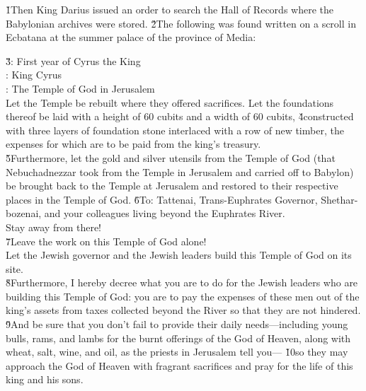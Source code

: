 \v{1}Then King Darius issued an order to search the Hall of Records where the Babylonian archives were stored. \v{2}The following was found written on a scroll in Ecbatana at the summer palace of the province of Media:

\begin{poetry}
\poeml \v{3}: First year of Cyrus the King \\
\poeml {}: King Cyrus \\
\poeml {}: The Temple of God in Jerusalem \\
\poeml Let the Temple be rebuilt where they offered sacrifices. Let the foundations thereof be laid with a height of 60 cubits and a width of 60 cubits, \v{4}constructed with three layers of foundation stone interlaced with a row of new timber, the expenses for which are to be paid from the king's treasury. \\
\poeml \v{5}Furthermore, let the gold and silver utensils from the Temple of God (that Nebuchadnezzar took from the Temple in Jerusalem and carried off to Babylon) be brought back to the Temple at Jerusalem and restored to their respective places in the Temple of God.
\poeml \v{6}To: Tattenai, Trans-Euphrates Governor, Shethar-bozenai, and your colleagues living beyond the Euphrates River. \\
\poeml Stay away from there! \\
\poeml \v{7}Leave the work on this Temple of God alone! \\
\poeml Let the Jewish governor and the Jewish leaders build this Temple of God on its site. \\
\poeml \v{8}Furthermore, I hereby decree what you are to do for the Jewish leaders who are building this Temple of God: you are to pay the expenses of these men out of the king's assets from taxes collected beyond the River so that they are not hindered. \\
\poeml \v{9}And be sure that you don't fail to provide their daily needs---including young bulls, rams, and lambs for the burnt offerings of the God of Heaven, along with wheat, salt, wine, and oil, as the priests in Jerusalem tell you--- \v{10}so they may approach the God of Heaven with fragrant sacrifices and pray for the life of this king and his sons. \\

\end{poetry}

